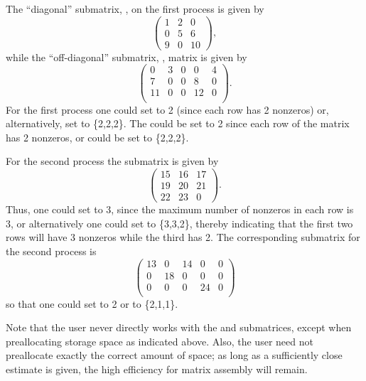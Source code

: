 The ``diagonal'' submatrix, , on the first process is given by 
{\small
\[
\left( \begin{array}{ccc} 
1  & 2  & 0  \\
0  & 5  & 6  \\
9  & 0  & 10 
\end{array} \right),
\]
}
while the ``off-diagonal'' submatrix, , matrix is given by 
{\small
\[
\left( \begin{array}{ccccc} 
 0  & 3  & 0   & 0  & 4  \\
 7  & 0  & 0   & 8  & 0  \\
 11 & 0  & 0   & 12 & 0  \\
\end{array} \right).
\]
}
For the first process one could set  to 2 (since each
row has 2 nonzeros) or, alternatively, set  to \{2,2,2\}.
The  could be set to 2 since each row of the  matrix
has 2 nonzeros, or  could be set to \{2,2,2\}.

For the second process the  submatrix is given by 
{\small
\[
\left( \begin{array}{cccccccccc} 
 15 & 16 & 17 \\
 19 & 20 & 21 \\
 22 & 23 & 0  
\end{array} \right) .
\]
}
Thus, one could set  to 3, since the maximum number of
nonzeros in each row is 3, or alternatively one could set  to
\{3,3,2\}, thereby indicating that the first two rows will have 3
nonzeros while the third has 2. The corresponding  submatrix for the
second process is
{\small
\[
\left( \begin{array}{cccccccccc} 
13 & 0  & 14 &  0  & 0  \\
0  & 18 & 0  &  0  & 0 \\
0  & 0  & 0  &  24 & 0 \\
\end{array} \right)
\]
}
so that one could set  to 2 or  to \{2,1,1\}.

Note that the user never directly works with the  and 
submatrices, except when preallocating storage space as indicated above.
Also, the user need not preallocate exactly the correct amount of
space; as long as a sufficiently close estimate is given, the high
efficiency for matrix assembly will remain.  


